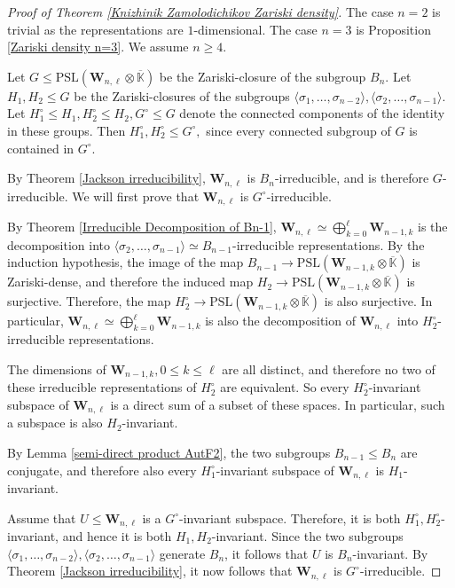 \documentclass[letterpaper]{amsart}
\begin{document}
\begin{proof}[Proof of Theorem \ref{Knizhinik Zamolodichikov Zariski density}]
The case $n = 2$ is trivial as the representations are $1$-dimensional. The case $n = 3$ is Proposition \ref{Zariski density n=3}. We assume $n \geq 4.$

Let $G \leq \mathrm{PSL}(\textbf{W}_{n,\ell} \otimes \overline{\mathbb{K}})$ be the Zariski-closure of the subgroup $B_n.$ Let $H_1, H_2 \leq G$ be the Zariski-closures of the subgroups $\langle \sigma_1, \dots, \sigma_{n-2} \rangle, \langle \sigma_2, \dots, \sigma_{n-1} \rangle.$ Let $H_1^\circ \leq H_1, H_2^\circ \leq H_2, G^\circ \leq G$ denote the connected components of the identity in these groups. Then $H_1^\circ, H_2^\circ \leq G^\circ,$ since every connected subgroup of $G$ is contained in $G^\circ.$

By Theorem \ref{Jackson irreducibility}, $\textbf{W}_{n, \ell}$ is $B_n$-irreducible, and is therefore $G$-irreducible. We will first prove that $\textbf{W}_{n, \ell}$ is $G^\circ$-irreducible.

By Theorem \ref{Irreducible Decomposition of Bn-1}, $\textbf{W}_{n, \ell} \simeq \bigoplus_{k=0}^\ell \textbf{W}_{n-1, k}$ is the decomposition into $\langle \sigma_2, \dots, \sigma_{n-1}\rangle \simeq B_{n-1}$-irreducible representations. By the induction hypothesis, the image of the map $B_{n-1} \to \mathrm{PSL}(\textbf{W}_{n-1, k} \otimes \overline{\mathbb{K}})$ is Zariski-dense, and therefore the induced map $H_2 \to \mathrm{PSL}(\textbf{W}_{n-1, k} \otimes \overline{\mathbb{K}})$ is surjective. Therefore, the map $H_2^\circ \to \mathrm{PSL}(\textbf{W}_{n-1, k} \otimes \overline{\mathbb{K}})$ is also surjective. In particular, $\textbf{W}_{n, \ell} \simeq \bigoplus_{k=0}^\ell \textbf{W}_{n-1, k}$ is also the decomposition of $\textbf{W}_{n, \ell}$ into $H_2^\circ$-irreducible representations.

The dimensions of $\textbf{W}_{n-1, k}, 0 \leq k \leq \ell$ are all distinct, and therefore no two of these irreducible representations of $H_2^\circ$ are equivalent. So every $H_2^\circ$-invariant subspace of $\textbf{W}_{n, \ell}$ is a direct sum of a subset of these spaces. In particular, such a subspace is also $H_2$-invariant.

By Lemma \ref{semi-direct product AutF2}, the two subgroups $B_{n-1} \leq B_n$ are conjugate, and therefore also every $H_1^\circ$-invariant subspace of $\textbf{W}_{n, \ell}$ is $H_1$-invariant.

Assume that $U \leq \textbf{W}_{n, \ell}$ is a $G^\circ$-invariant subspace. Therefore, it is both $H_1^\circ, H_2^\circ$-invariant, and hence it is both $H_1, H_2$-invariant. Since the two subgroups $\langle \sigma_1, \dots, \sigma_{n-2} \rangle, \langle \sigma_2, \dots, \sigma_{n-1} \rangle$ generate $B_n$, it follows that $U$ is $B_n$-invariant. By Theorem \ref{Jackson irreducibility}, it now follows that $\textbf{W}_{n, \ell}$ is $G^\circ$-irreducible.


\end{proof}
\end{document}
